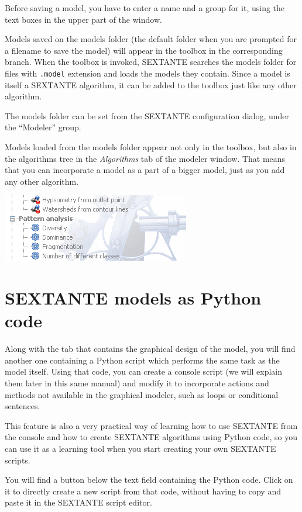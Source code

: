 Before saving a model, you have to enter a name and a group for it, using the text boxes in the upper part of the window.

Models saved on the models folder (the default folder when you are prompted for a filename to save the model) will appear in the toolbox in the corresponding branch. When the toolbox is invoked, SEXTANTE searches the models folder for files with \texttt{.model} extension and loads the models they contain. Since a model is itself a SEXTANTE algorithm, it can be added to the toolbox just like any other algorithm.

The models folder can be set from the SEXTANTE configuration dialog, under the ``Modeler'' group.

Models loaded from the models folder appear not only in the toolbox, but also in the algorithms tree in the \emph{Algorithms} tab of the modeler window. That means that you can incorporate a model as a part of a bigger model, just as you add any other algorithm. 

\begin{center}
\includegraphics[width=.5\columnwidth]{models_icon.png}
\end{center}


\section{SEXTANTE models as Python code}

Along with the tab that contains the graphical design of the model, you will find another one containing a Python script which performs the same task as the model itself. Using that code, you can create a console script (we will explain them later in this same manual) and modify it to incorporate actions and methods not available in the graphical modeler, such as loops or conditional sentences.

This feature is also a very practical way of learning how to use SEXTANTE from the console and how to create SEXTANTE algorithms using Python code, so you can use it as a learning tool when you start creating your own SEXTANTE scripts.

You will find a button below the text field containing the Python code. Click on it to directly create a new script from that code, without having to copy and paste it in the SEXTANTE script editor.